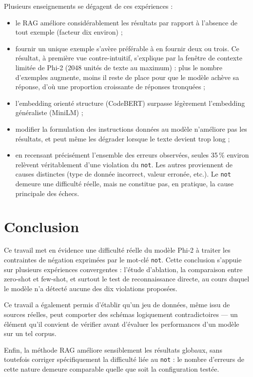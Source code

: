 \documentclass[11pt,a4paper]{article}
\begin{document}
Plusieurs enseignements se dégagent de ces expériences :
\begin{itemize}
    \item le RAG améliore considérablement les résultats par rapport à l'absence de tout exemple (facteur dix environ) ;
    \item fournir un unique exemple s'avère préférable à en fournir deux ou trois. Ce résultat, à première vue contre-intuitif, s'explique par la fenêtre de contexte limitée de Phi-2 (2048 unités de texte au maximum) : plus le nombre d'exemples augmente, moins il reste de place pour que le modèle achève sa réponse, d'où une proportion croissante de réponses tronquées ;
    \item l'embedding orienté structure (CodeBERT) surpasse légèrement l'embedding généraliste (MiniLM) ;
    \item modifier la formulation des instructions données au modèle n'améliore pas les résultats, et peut même les dégrader lorsque le texte devient trop long ;
    \item en recensant précisément l'ensemble des erreurs observées, seules 35\,\% environ relèvent véritablement d'une violation du \texttt{not}. Les autres proviennent de causes distinctes (type de donnée incorrect, valeur erronée, etc.). Le \texttt{not} demeure une difficulté réelle, mais ne constitue pas, en pratique, la cause principale des échecs.
\end{itemize}

\section{Conclusion}

Ce travail met en évidence une difficulté réelle du modèle Phi-2 à traiter les contraintes de négation exprimées par le mot-clé \texttt{not}. Cette conclusion s'appuie sur plusieurs expériences convergentes : l'étude d'ablation, la comparaison entre zero-shot et few-shot, et surtout le test de reconnaissance directe, au cours duquel le modèle n'a détecté aucune des dix violations proposées.

Ce travail a également permis d'établir qu'un jeu de données, même issu de sources réelles, peut comporter des schémas logiquement contradictoires — un élément qu'il convient de vérifier avant d'évaluer les performances d'un modèle sur un tel corpus.

Enfin, la méthode RAG améliore sensiblement les résultats globaux, sans toutefois corriger spécifiquement la difficulté liée au \texttt{not} : le nombre d'erreurs de cette nature demeure comparable quelle que soit la configuration testée.
\end{document}
